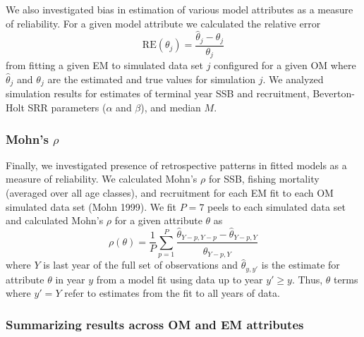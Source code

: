 \documentclass[
  12pt,
]{article}
\begin{document}
We also investigated bias in estimation of various model attributes as a
measure of reliability. For a given model attribute we calculated the
relative error \begin{equation}\label{relerror}
\text{RE}\left(\theta_j\right) = \frac{\widehat \theta_j - \theta_j}{\theta_j}
\end{equation} from fitting a given EM to simulated data set \(j\)
configured for a given OM where \(\widehat \theta_j\) and \(\theta_j\)
are the estimated and true values for simulation \(j\). We analyzed
simulation results for estimates of terminal year SSB and recruitment,
Beverton-Holt SRR parameters (\(\alpha\) and \(\beta\)), and median
\(M\).

\subsubsection*{\texorpdfstring{Mohn's
\(\rho\)}{Mohn's \textbackslash rho}}\label{mohns-rho}

Finally, we investigated presence of retrospective patterns in fitted
models as a measure of reliability. We calculated Mohn's \(\rho\) for
SSB, fishing mortality (averaged over all age classes), and recruitment
for each EM fit to each OM simulated data set (Mohn 1999). We fit
\(P = 7\) peels to each simulated data set and calculated Mohn's
\(\rho\) for a given attribute \(\theta\) as
\begin{equation}\label{mohns_rho}
\rho\left(\theta\right) = \frac{1}{P}\sum^P_{p=1} \frac{\widehat \theta_{Y-p,Y-p} - \widehat\theta_{Y-p,Y}}{\widehat\theta_{Y-p,Y}}
\end{equation} where \(Y\) is last year of the full set of observations
and \(\widehat \theta_{y,y'}\) is the estimate for attribute \(\theta\)
in year \(y\) from a model fit using data up to year \(y'\geq y\). Thus,
\(\theta\) terms where \(y'=Y\) refer to estimates from the fit to all
years of data.

\subsubsection*{Summarizing results across OM and EM
attributes}\label{summarizing-results-across-om-and-em-attributes}
\end{document}
